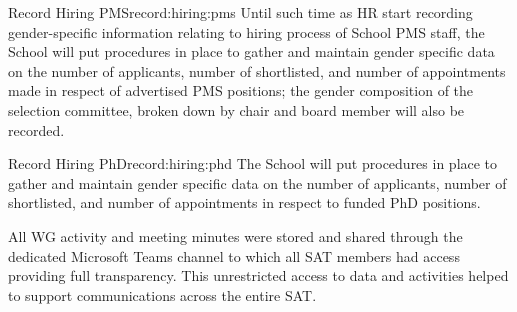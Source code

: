 \newcommand{\actrecordhiringpms}{Until such time as HR start recording gender-specific information relating to hiring process of School PMS staff, the School will put procedures in place to gather and maintain gender specific data on the number of applicants, number of shortlisted, and number of appointments made in respect of advertised PMS positions; the gender composition of the selection committee, broken down by chair and board member will also be recorded.
}


\begin{actionblock}{\ksspace{}Record Hiring PMS}{record:hiring:pms}
  \actrecordhiringpms 
  \hfill{
    \hypersetup{hidelinks}
    \hyperlink{a2}{\gotoactionsymbol{}
    }}
\end{actionblock}





\newcommand{\actrecordhiringphd}{The School will put procedures in place to gather and maintain gender specific data on the number of applicants, number of shortlisted, and number of appointments in respect to funded PhD positions.
}
\begin{actionblock}{\ksspace{}Record Hiring PhD}{record:hiring:phd}
  \actrecordhiringphd 
  \hfill{
    \hypersetup{hidelinks}
    \hyperlink{aa0}{\gotoactionsymbol{}
    }}
\end{actionblock}


All WG activity and meeting minutes were stored and shared through the dedicated Microsoft Teams channel to which all SAT members had access providing full transparency.
This unrestricted access to data and activities helped to support communications across the entire SAT. 

